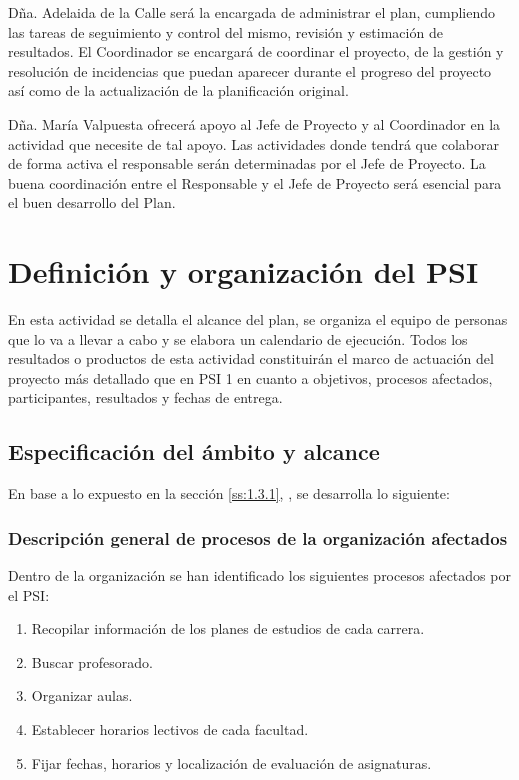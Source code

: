\documentclass[11pt,a4paper,spanish,twoside]{book}
\begin{document}
Dña. Adelaida de la Calle será la encargada de administrar el plan,
cumpliendo las tareas de seguimiento y control del mismo, revisión y 
estimación de resultados. El Coordinador se encargará de coordinar el
proyecto, de la gestión y resolución de incidencias que puedan aparecer 
durante el progreso del proyecto así como de la actualización de la 
planificación original.

Dña. María Valpuesta ofrecerá apoyo al Jefe de Proyecto y al Coordinador en
la actividad que necesite de tal apoyo. Las actividades donde tendrá que 
colaborar de forma activa el responsable serán determinadas por el Jefe de 
Proyecto. La buena coordinación entre el Responsable y el Jefe de Proyecto 
será esencial para el buen desarrollo del Plan.


\chapter{Definición y organización del PSI}
En esta actividad se detalla el alcance del plan, se organiza el equipo de
personas que lo va a llevar a cabo y se elabora un calendario de
ejecución. Todos los resultados o productos de esta actividad constituirán el
marco de actuación del proyecto más detallado que en PSI 1 en cuanto a
objetivos, procesos afectados, participantes, resultados y fechas de
entrega. 

\section{Especificación del ámbito y alcance}
En base a lo expuesto en la sección \vref{ss:1.3.1}, \emph{},
se desarrolla lo siguiente:

\subsection{Descripción general de procesos de la organización afectados}
\label{ss:2.1.1}
Dentro de la organización se han identificado los siguientes procesos afectados 
por el PSI:
\begin{enumerate}
  \item Recopilar información de los planes de estudios de cada carrera.
  \item Buscar profesorado.
  \item Organizar aulas.
  \item Establecer horarios lectivos de cada facultad.
  \item Fijar fechas, horarios y localización de evaluación de asignaturas.
\end{enumerate}
\end{document}
